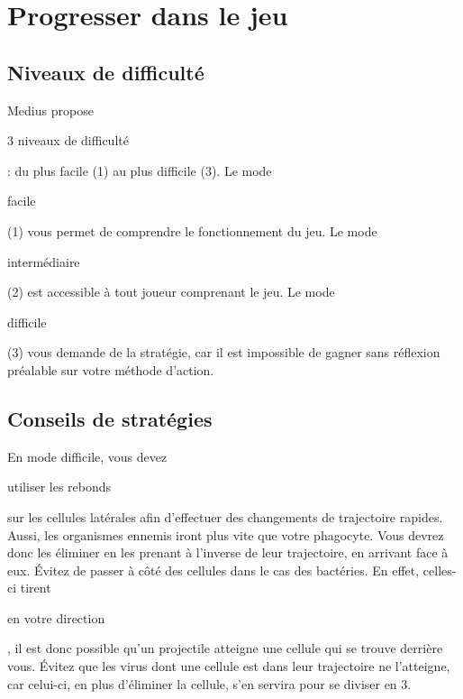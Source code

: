 \documentclass{article}
\begin{document}
\section{Progresser dans le jeu}

\subsection{Niveaux de difficulté}

Medius propose \begin{bfseries}3 niveaux de difficulté\end{bfseries} : du plus facile (1) au plus difficile (3).
\newline\newline
Le mode \begin{bfseries}facile\end{bfseries} (1) vous permet de comprendre le fonctionnement du jeu.
Le mode \begin{bfseries}intermédiaire\end{bfseries} (2) est accessible à tout joueur comprenant le jeu.
Le mode \begin{bfseries}difficile\end{bfseries} (3) vous demande de la stratégie, car il est impossible de gagner sans réflexion préalable sur votre méthode d'action.
\newline\newline

\subsection{Conseils de stratégies}

En mode difficile, vous devez \begin{bfseries}utiliser les rebonds\end{bfseries} sur les cellules latérales afin d'effectuer des changements de trajectoire rapides.
\newline\newline
Aussi, les organismes ennemis iront plus vite que votre phagocyte. Vous devrez donc les éliminer en les prenant à l'inverse de leur trajectoire, en arrivant face à eux.
\newline\newline
Évitez de passer à côté des cellules dans le cas des bactéries. En effet, celles-ci tirent \begin{bfseries}en votre direction\end{bfseries}, il est donc possible qu'un projectile atteigne une cellule qui se trouve derrière vous.
\newline\newline
Évitez que les virus dont une cellule est dans leur trajectoire ne l'atteigne, car celui-ci, en plus d'éliminer la cellule, s'en servira pour se diviser en 3.
\newline\newline
\end{document}
